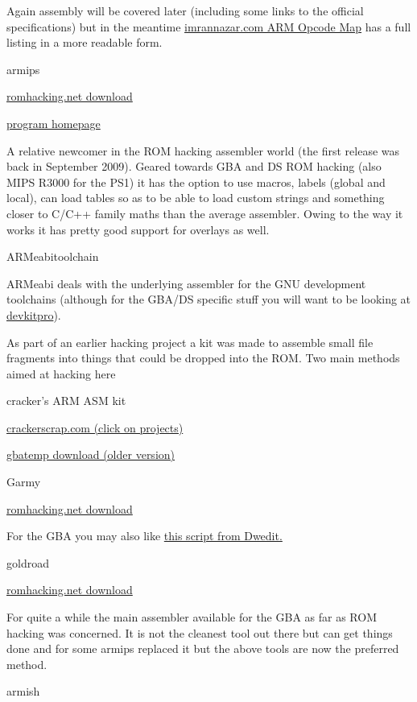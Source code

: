 \documentclass[
]{book}
\begin{document}
Again assembly will be covered later (including some links to the official specifications) but in the meantime \href{http://imrannazar.com/ARM-Opcode-Map}{imrannazar.com ARM Opcode Map} has a full listing in a more readable form.

armips

\href{http://www.romhacking.net/utilities/635/}{romhacking.net download}

\href{http://aerie.wingdreams.net/?page_id=6}{program homepage}

A relative newcomer in the ROM hacking assembler world (the first release was back in September 2009). Geared towards GBA and DS ROM hacking (also MIPS R3000 for the PS1) it has the option to use macros, labels (global and local), can load tables so as to be able to load custom strings and something closer to C/C++ family maths than the average assembler. Owing to the way it works it has pretty good support for overlays as well.

ARMeabitoolchain

ARMeabi deals with the underlying assembler for the GNU development toolchains (although for the GBA/DS specific stuff you will want to be looking at \href{http://devkitpro.org/}{devkitpro}).

As part of an earlier hacking project a kit was made to assemble small file fragments into things that could be dropped into the ROM. Two main methods aimed at hacking here

cracker's ARM ASM kit

\href{http://crackerscrap.com/}{crackerscrap.com (click on projects)}

\href{http://gbatemp.net/up/cr-dstmt.zip}{gbatemp download (older version)}

Garmy

\href{http://www.romhacking.net/utilities/456/}{romhacking.net download}

For the GBA you may also like \href{http://forums.nesdev.com/viewtopic.php?f=5\&t=10176\&start=0\#p113532}{this script from Dwedit.}

goldroad

\href{http://www.romhacking.net/utilities/343/}{romhacking.net download}

For quite a while the main assembler available for the GBA as far as ROM hacking was concerned. It is not the cleanest tool out there but can get things done and for some armips replaced it but the above tools are now the preferred method.

armish
\end{document}
